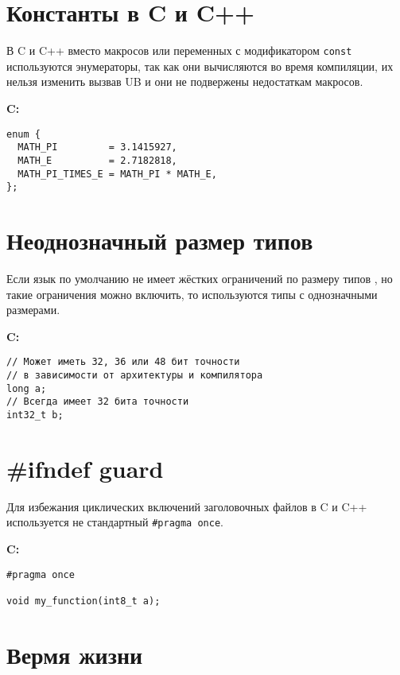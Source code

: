 \documentclass[12p]{article}
\begin{document}
\section{Константы в C и C++}

В C и C++ вместо макросов или переменных с модификатором \texttt{const} используются энумераторы, так как они вычисляются во время компиляции, их нельзя изменить вызвав UB \cite{c_const_override} и они не подвержены недостаткам макросов.\newline

\textbf{C:}
\begin{verbatim}
enum {
  MATH_PI         = 3.1415927,
  MATH_E          = 2.7182818,
  MATH_PI_TIMES_E = MATH_PI * MATH_E,
};
\end{verbatim}

\section{Неоднозначный размер типов}

Если язык по умолчанию не имеет жёстких ограничений по размеру типов \cite{data_type_sizes}, но такие ограничения можно включить, то используются типы с однозначными размерами.\newline

\textbf{C:}
\begin{verbatim}
// Может иметь 32, 36 или 48 бит точности
// в зависимости от архитектуры и компилятора
long a;
// Всегда имеет 32 бита точности
int32_t b;
\end{verbatim}

\section{\#ifndef guard}

Для избежания циклических включений заголовочных файлов в C и C++ используется не стандартный \texttt{#pragma once}.\newline

\textbf{C:}
\begin{verbatim}
#pragma once

void my_function(int8_t a);
\end{verbatim}
\pagebreak

\section{Вермя жизни}
\end{document}
